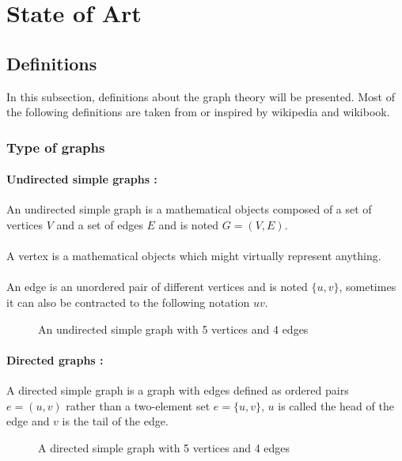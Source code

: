 \section{State of Art}
\subsection{Definitions}
In this subsection, definitions about the graph theory will be presented. Most
of the following definitions are taken from or inspired by wikipedia and
wikibook.

\subsubsection{Type of graphs}
\paragraph{Undirected simple graphs :}
An undirected simple graph is a mathematical objects composed of a set of
vertices $V$ and a set of edges $E$ and is noted $G = (V,E)$.

\paragraph{}
A vertex is a mathematical objects which might virtually represent anything.

\paragraph{}
An edge is an unordered pair of different vertices and is noted $\{u,v\}$,
sometimes it can also be contracted to the following notation $uv$.

\begin{figure}[!h]
  \begin{center}
    
  \end{center}
  \caption{An undirected simple graph with 5 vertices and 4 edges}
\end{figure}

\paragraph{Directed graphs :} 
A directed simple graph is a graph with edges defined as ordered pairs
$e = (u,v)$ rather than a two-element set $e = \{u,v\}$, $u$ is called the
head of the edge and $v$ is the tail of the edge.
\begin{figure}[!h]
  \begin{center}
    
  \end{center}
  \caption{A directed simple graph with 5 vertices and 4 edges}
\end{figure}


